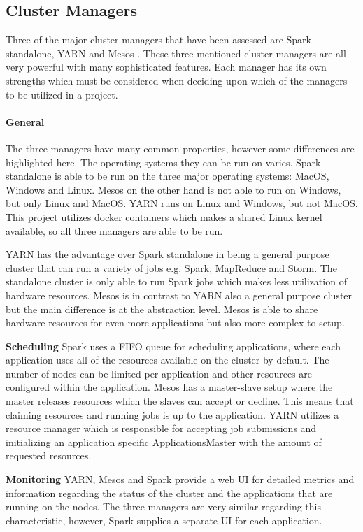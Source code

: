 \documentclass[main.tex]{subfiles}
\begin{document}
\subsection{Cluster Managers}
Three of the major cluster managers that have been assessed are Spark standalone, YARN and Mesos \cite{clusterManagers}.
These three mentioned cluster managers are all very powerful with many sophisticated features. Each manager has its own strengths which must be considered when deciding upon which of the managers to be utilized in a project. 


\paragraph{General}
The three managers have many common properties, however some differences are highlighted here. The operating systems they can be run on varies. Spark standalone is able to be run on the three major operating systems: MacOS, Windows and Linux. Mesos on the other hand is not able to run on Windows, but only Linux and MacOS. YARN runs on Linux and Windows, but not MacOS. This project utilizes docker containers which makes a shared Linux kernel available, so all three managers are able to be run.

YARN has the advantage over Spark standalone in being a general purpose cluster that can run a variety of jobs e.g. Spark, MapReduce and Storm. The standalone cluster is only able to run Spark jobs which makes less utilization of hardware resources. Mesos is in contrast to YARN also a general purpose cluster but the main difference is at the abstraction level. Mesos is able to share hardware resources for even more applications but also more complex to setup.



\textbf{Scheduling}
Spark uses a FIFO queue for scheduling applications, where each application uses all of the resources available on the cluster by default. The number of nodes can be limited per application and other resources are configured within the application. Mesos has a master-slave setup where the master releases resources which the slaves can accept or decline. This means that claiming resources and running jobs is up to the application. YARN utilizes a resource manager which is responsible for accepting job submissions and initializing an application specific ApplicationsMaster with the amount of requested resources. 

\textbf{Monitoring}
YARN, Mesos and Spark provide a web UI for detailed metrics and information regarding the status of the cluster and the applications that are running on the nodes. The three managers are very similar regarding this characteristic, however, Spark supplies a separate UI for each application. 
\end{document}
